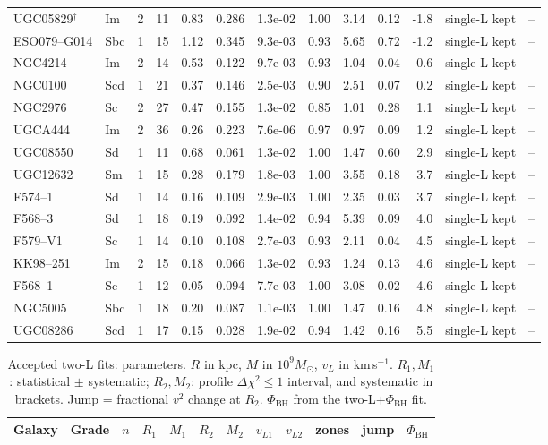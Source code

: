 \documentclass[10pt]{article}
\begin{document}
\begin{landscape}
{\begin{longtable}{lllrrrrrrrrll}
UGC05829$^\dagger$ & Im & 2 & 11 & 0.83 & 0.286 & 1.3e-02 & 1.00 & 3.14 & 0.12 & -1.8 & single-L kept & --\\
ESO079--G014 & Sbc & 1 & 15 & 1.12 & 0.345 & 9.3e-03 & 0.93 & 5.65 & 0.72 & -1.2 & single-L kept & --\\
NGC4214 & Im & 2 & 14 & 0.53 & 0.122 & 9.7e-03 & 0.93 & 1.04 & 0.04 & -0.6 & single-L kept & --\\
NGC0100 & Scd & 1 & 21 & 0.37 & 0.146 & 2.5e-03 & 0.90 & 2.51 & 0.07 & 0.2 & single-L kept & --\\
NGC2976 & Sc & 2 & 27 & 0.47 & 0.155 & 1.3e-02 & 0.85 & 1.01 & 0.28 & 1.1 & single-L kept & --\\
UGCA444 & Im & 2 & 36 & 0.26 & 0.223 & 7.6e-06 & 0.97 & 0.97 & 0.09 & 1.2 & single-L kept & --\\
UGC08550 & Sd & 1 & 11 & 0.68 & 0.061 & 1.3e-02 & 1.00 & 1.47 & 0.60 & 2.9 & single-L kept & --\\
UGC12632 & Sm & 1 & 15 & 0.28 & 0.179 & 1.8e-03 & 1.00 & 3.55 & 0.18 & 3.7 & single-L kept & --\\
F574--1 & Sd & 1 & 14 & 0.16 & 0.109 & 2.9e-03 & 1.00 & 2.35 & 0.03 & 3.7 & single-L kept & --\\
F568--3 & Sd & 1 & 18 & 0.19 & 0.092 & 1.4e-02 & 0.94 & 5.39 & 0.09 & 4.0 & single-L kept & --\\
F579--V1 & Sc & 1 & 14 & 0.10 & 0.108 & 2.7e-03 & 0.93 & 2.11 & 0.04 & 4.5 & single-L kept & --\\
KK98--251 & Im & 2 & 15 & 0.18 & 0.066 & 1.3e-02 & 0.93 & 1.24 & 0.13 & 4.6 & single-L kept & --\\
F568--1 & Sc & 1 & 12 & 0.05 & 0.094 & 7.7e-03 & 1.00 & 3.08 & 0.02 & 4.6 & single-L kept & --\\
NGC5005 & Sbc & 1 & 18 & 0.20 & 0.087 & 1.1e-03 & 1.00 & 1.47 & 0.16 & 4.8 & single-L kept & --\\
UGC08286 & Scd & 1 & 17 & 0.15 & 0.028 & 1.9e-02 & 0.94 & 1.42 & 0.16 & 5.5 & single-L kept & --\\
\end{longtable}
\begin{longtable}{llrlllllrrrr}
\caption{Accepted two-L fits: parameters. $R$ in kpc, $M$ in $10^9M_\odot$, $v_L$ in km\,s$^{-1}$. $R_1,M_1$: statistical $\pm$ systematic; $R_2,M_2$: profile $\Delta\chi^2\le1$ interval, and systematic in brackets. Jump = fractional $v^2$ change at $R_2$. $\Phi_\mathrm{BH}$ from the two-L$+\Phi_\mathrm{BH}$ fit.}\\\toprule
Galaxy & Grade & $n$ & $R_1$ & $M_1$ & $R_2$ & $M_2$ & $v_{L1}$ & $v_{L2}$ & zones & jump & $\Phi_\mathrm{BH}$\\\midrule\endfirsthead

\end{longtable}}
\end{landscape}
\end{document}
